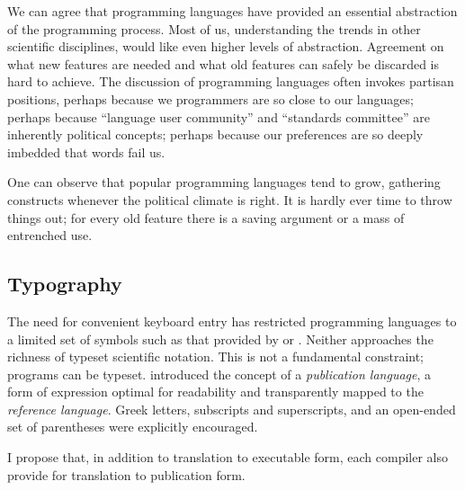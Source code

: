We can agree that programming languages have provided an essential
abstraction of the programming process.  Most of us, understanding the
trends in other scientific disciplines, would like even higher levels
of abstraction.  Agreement on what new features are needed and what
old features can safely be discarded is hard to achieve.  The
discussion of programming languages often invokes partisan positions,
perhaps because we programmers are so close to our languages; perhaps
because ``language user community'' and ``standards committee'' are
inherently political concepts; perhaps because our preferences are so
deeply imbedded that words fail us.

One can observe that popular programming languages tend to grow,
gathering constructs whenever the political climate is right.  It is
hardly ever time to throw things out; for every old feature there is a
saving argument or a mass of entrenched use.

\subsection{Typography}

The need for convenient keyboard entry has restricted programming
languages to a limited set of symbols such as that provided by
 or .  Neither approaches the richness of
typeset scientific notation.  This is not a fundamental constraint;
programs can be typeset.   introduced the concept of a
{\em publication language}, a form of expression optimal for
readability and transparently mapped to the {\em reference language}.
Greek letters, subscripts and superscripts, and an open-ended set of
parentheses were explicitly encouraged.  

I propose that, in addition to translation to executable form, each
compiler also provide for translation to publication form.



